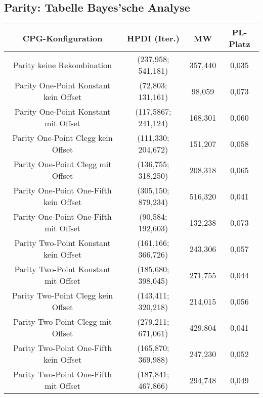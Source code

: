 \subsection{Parity: Tabelle Bayes'sche Analyse}
\label{subsec:appendixTabelleBayesParity}
 \begin{table}[H]
	\centering
	\begin{tabular}{c | c | c | c}
		\textbf{CPG-Konfiguration} & \textbf{HPDI (Iter.)} & \textbf{MW} & \textbf{PL-Platz}\\
		\hline
		Parity keine Rekombination & (237,958; 541,181) & \color{red}357,440\color{black} & \color{red}0,035\color{black}\\
		\hline
		\hline
		Parity One-Point Konstant kein Offset & \color{Green}(72,803; 131,161)\color{black} & \color{Green}98,059\color{black} & \color{Green} 0,073 \color{black}\\
		\hline
		Parity One-Point Konstant mit Offset & (117,5867; 241,124) & 168,301 & 0,060\\
		\hline
		Parity One-Point Clegg kein Offset & \color{Green}(111,330; 204,672)\color{black} & \color{Green}151,207\color{black} & 0,058\\
		\hline
		Parity One-Point Clegg mit Offset & (136,755; 318,250) & 208,318 & \color{Green}0,065\color{black}\\
		\hline
		Parity One-Point One-Fifth kein Offset & \color{red}(305,150; 879,234)\color{black} & \color{red}516,320\color{black} & 0,041\\
		\hline
		Parity One-Point One-Fifth mit Offset & \color{Green}(90,584; 192,603)\color{black} & \color{Green}132,238\color{black} & \color{Green}0,073 \color{black}\\
		\hline
		\hline
		Parity Two-Point Konstant kein Offset & (161,166; 366,726) & 243,306 & 0,057\\
		\hline
		Parity Two-Point Konstant mit Offset & (185,680; 398,045) & 271,755 & 0,044\\
		\hline
		Parity Two-Point Clegg kein Offset & (143,411; 320,218) & 214,015 & 0,056\\
		\hline
		Parity Two-Point Clegg mit Offset & \color{red}(279,211; 671,061)\color{black} & \color{red}429,804\color{black} & 0,041\\
		\hline
		Parity Two-Point One-Fifth kein Offset & (165,870; 369,988) & 247,230 & 0,052\\
		\hline
		Parity Two-Point One-Fifth mit Offset & (187,841; 467,866) & 294,748 & 0,049\\
		\hline
		\hline

\end{tabular}
\end{table}
